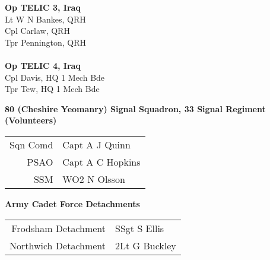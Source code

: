 \begin{multicols}{2}
  \noindent
  \textbf{Op TELIC 3, Iraq} \\
  Lt W N Bankes, QRH \\
  Cpl Carlaw, QRH \\
  Tpr Pennington, QRH \\
  \\
  \textbf{Op TELIC 4, Iraq} \\
  Cpl Davis, HQ 1 Mech Bde \\
  Tpr Tew, HQ 1 Mech Bde \\
\end{multicols}

\vspace*{10mm}

\pagebreak

\vspace*{10mm}

\begin{center}
  \Large
  \textbf{80 (Cheshire Yeomanry) Signal Squadron, 33 Signal Regiment (Volunteers)}
\end{center}

\begin{center}
  \begin{tabular}{rl}
    Sqn Comd & Capt A J Quinn \\
    PSAO & Capt A C Hopkins \\
    SSM & WO2 N Olsson \\
  \end{tabular}
\end{center}

\vspace*{10mm}

\begin{center}
  \Large
  \textbf{Army Cadet Force Detachments}
\end{center}

\begin{center}
  \begin{tabular}{rl}
    Frodsham Detachment & SSgt S Ellis \\
    Northwich Detachment & 2Lt G Buckley \\
  \end{tabular}
\end{center}
